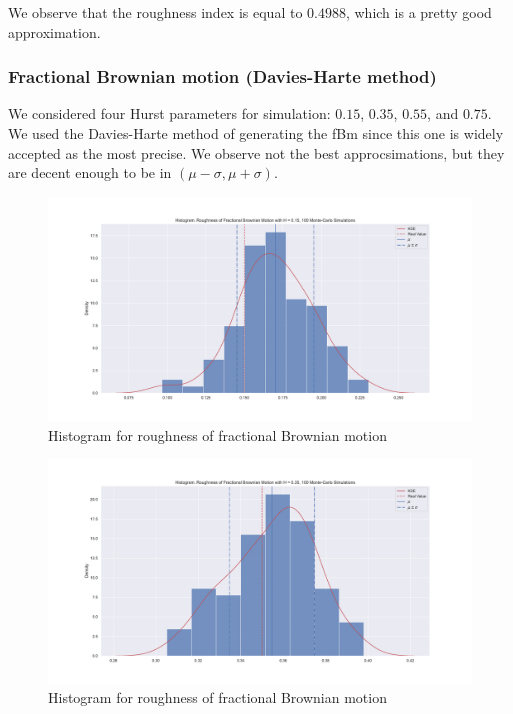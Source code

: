             We observe that the roughness index is equal to $0.4988$, which is a pretty good approximation.

        \subsubsection{Fractional Brownian motion (Davies-Harte method)}
            We considered four Hurst parameters for simulation: $0.15$, $0.35$, $0.55$, and $0.75$. We used the Davies-Harte method of generating 
            the fBm since this one is widely accepted as the most precise. We observe not the best approcsimations, but they are decent enough to be in $(\mu-\sigma, \mu+\sigma)$.
            \begin{figure}[htbp]
                \centering
                \includegraphics[width=\linewidth]{fig/Histogram. Roughness of Fractional Brownian Motion with H = 0.15, 100 Monte-Carlo Simulations.pdf}
                \caption{Histogram for roughness of fractional Brownian motion}
            \end{figure}
            \begin{figure}[htbp]
                \centering
                \includegraphics[width=\linewidth]{fig/Histogram. Roughness of Fractional Brownian Motion with H = 0.35, 100 Monte-Carlo Simulations.pdf}
                \caption{Histogram for roughness of fractional Brownian motion}
            \end{figure}
